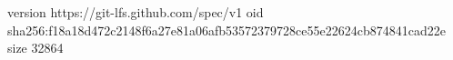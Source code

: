 version https://git-lfs.github.com/spec/v1
oid sha256:f18a18d472c2148f6a27e81a06afb53572379728ce55e22624cb874841cad22e
size 32864
